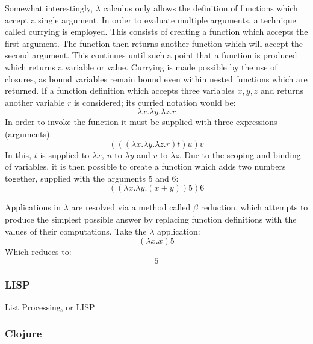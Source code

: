 \documentclass[12pt,a4paper]{article}
\begin{document}
Somewhat interestingly, $\lambda$ calculus only allows the definition of functions which accept a single argument. In order to evaluate multiple arguments, a technique called currying is employed. This consists of creating a function which accepts the first argument. The function then returns another function which will accept the second argument. This continues until such a point that a function is produced which returns a variable or value. Currying is made possible by the use of closures, as bound variables remain bound even within nested functions which are returned. If a function definition which accepts three variables $x,y,z$ and returns another variable $r$ is considered; its curried notation would be:
\begin{displaymath}
    \lambda x. \lambda y. \lambda z.r
\end{displaymath}
In order to invoke the function it must be supplied with three expressions (arguments):
\begin{displaymath}
    (((\lambda x. \lambda y. \lambda z.r) t ) u ) v
\end{displaymath}
In this, $t$ is supplied to $\lambda x$, $u$ to $\lambda y$ and $v$ to $\lambda z$. Due to the scoping and binding of variables, it is then possible to create a function which adds two numbers together, supplied with the arguments 5 and 6:
\begin{displaymath}
    ((\lambda x. \lambda y.(x+y) ) 5 ) 6
\end{displaymath}

Applications in $\lambda$ are resolved via a method called $\beta$ reduction, which attempts to produce the simplest possible answer by replacing function definitions with the values of their computations. Take the $\lambda$ application:
\begin{displaymath}
    (\lambda x.x)5
\end{displaymath}
Which reduces to:
\begin{displaymath}
    5
\end{displaymath}

\subsubsection{LISP}


List Processing, or LISP  \cite{historyOfLisp}





\subsubsection{Clojure}
\end{document}
